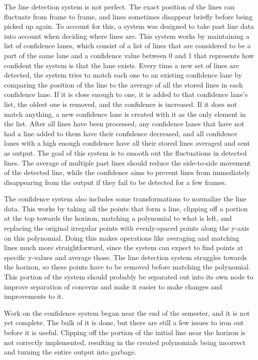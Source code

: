 \documentclass[titlepage,draft]{article}
\begin{document}
The line detection system is not perfect. The exact position of the lines can fluctuate from frame to frame, and lines sometimes disappear briefly before being picked up again. To account for this, a system was designed to take past line data into account when deciding where lines are. This system works by maintaining a list of confidence lanes, which consist of a list of lines that are considered to be a part of the same lane and a confidence value between 0 and 1 that represents how confident the system is that the lane exists. Every time a new set of lines are detected, the system tries to match each one to an existing confidence lane by comparing the position of the line to the average of all the stored lines in each confidence lane. If it is close enough to one, it is added to that confidence lane's list, the oldest one is removed, and the confidence is increased. If it does not match anything, a new confidence lane is created with it as the only element in the list. After all lines have been processed, any confidence lanes that have not had a line added to them have their confidence decreased, and all confidence lanes with a high enough confidence have all their stored lines averaged and sent as output. The goal of this system is to smooth out the fluctuations in detected lines. The average of multiple past lines should reduce the side-to-side movement of the detected line, while the confidence aims to prevent lines from immediately disappearing from the output if they fail to be detected for a few frames.

The confidence system also includes some transformations to normalize the line data. This works by taking all the points that form a line, clipping off a portion at the top towards the horizon, matching a polynomial to what is left, and replacing the original irregular points with evenly-spaced points along the y-axis on this polynomial. Doing this makes operations like averaging and matching lines much more straightforward, since the system can expect to find points at specific y-values and average those. The line detection system struggles towards the horizon, so these points have to be removed before matching the polynomial. This portion of the system should probably be separated out into its own node to improve separation of concerns and make it easier to make changes and improvements to it.

Work on the confidence system began near the end of the semester, and it is not yet complete. The bulk of it is done, but there are still a few issues to iron out before it is useful. Clipping off the portion of the initial line near the horizon is not correctly implemented, resulting in the created polynomials being incorrect and turning the entire output into garbage.
\end{document}
